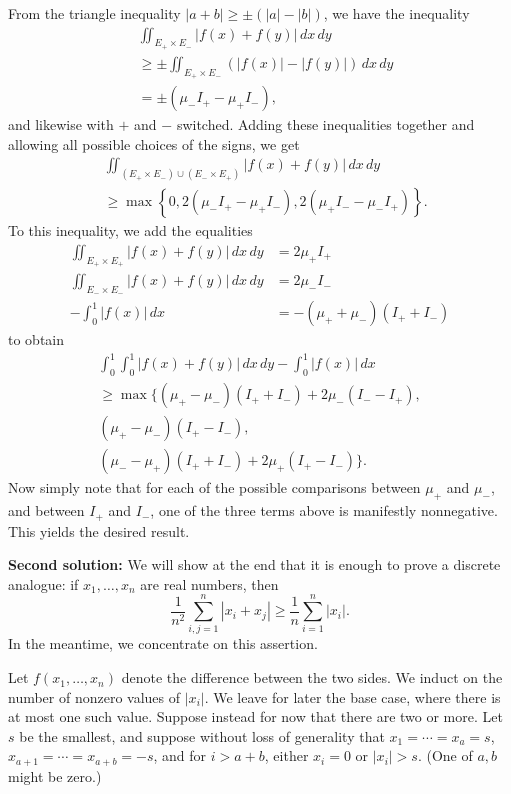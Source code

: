 \documentclass[amssymb,twocolumn,pra,10pt,aps]{revtex4-1}
\begin{document}
\begin{itemize}
From the triangle inequality $|a+b| \geq \pm(|a| - |b|)$,
we have the inequality
\begin{align*}
&\iint_{E_+ \times E_-} |f(x) + f(y)|\,dx\,dy \\
&\geq
\pm \iint_{E_+ \times E_-} (|f(x)| - |f(y)|)\,dx\,dy \\
&= \pm ( \mu_- I_+ - \mu_+ I_-),
\end{align*}
and likewise with $+$ and $-$ switched. Adding these inequalities together
and allowing all possible choices of the signs, we get
\begin{align*}
&\iint_{(E_+ \times E_-) \cup (E_- \times E_+)} |f(x) + f(y)|\,dx\,dy \\
&\geq
\max\left\{ 0, 2 (\mu_- I_+ - \mu_+ I_-), 2 (\mu_+ I_- - \mu_- I_+) \right\}.
\end{align*}
To this inequality, we add the equalities
\begin{align*}
\iint_{E_+ \times E_+} |f(x) + f(y)|\,dx\,dy &= 2 \mu_+ I_+ \\
\iint_{E_- \times E_-} |f(x) + f(y)|\,dx\,dy &= 2 \mu_- I_- \\
-\int_0^1 |f(x)|\,dx &= -(\mu_+ + \mu_-)(I_+ + I_-)
\end{align*}
to obtain
\begin{multline*}
\int_0^1 \int_0^1 |f(x)+f(y)|\,dx\,dy - \int_0^1 |f(x)|\,dx \\
\geq \max\{ (\mu_+ - \mu_-)(I_+ + I_-)+ 2\mu_-(I_- - I_+), \\
(\mu_+ - \mu_-)(I_+ - I_-), \\
(\mu_- - \mu_+)(I_+ + I_-)+ 2\mu_+(I_+ - I_-) \}.
\end{multline*}
Now simply note that for each of the possible comparisons between
$\mu_+$ and $\mu_-$, and between $I_+$ and $I_-$, one of the three
terms above is manifestly nonnegative. This yields the desired result.

\textbf{Second solution:}
We will show at the end that it
is enough to prove a discrete analogue: if $x_1, \dots, x_n$
are real numbers, then
\[
\frac{1}{n^2} \sum_{i,j=1}^n |x_i + x_j| \geq \frac{1}{n}
\sum_{i=1}^n |x_i|.
\]
In the meantime, we concentrate on this assertion.

Let $f(x_1, \dots, x_n)$ denote the difference between the two sides.
We induct
on the number of nonzero values of $|x_i|$. We leave for later the base case,
where there is at most one such value. Suppose instead for now that there
are two or more. Let $s$ be the smallest, and suppose without loss of
generality that $x_1 = \cdots = x_a = s$, $x_{a+1} = \cdots = x_{a+b} = -s$,
and for $i > a+b$, either $x_i = 0$ or $|x_i| > s$. (One of $a,b$ might be
zero.)


\end{itemize}
\end{document}
